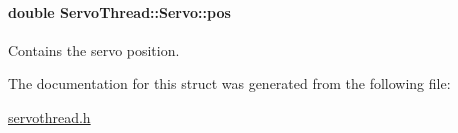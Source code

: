 \hypertarget{a00007_a9fa0aa56944b9b0bb9d66303d5bd4b59}{}
\paragraph[{pos}]{\setlength{\rightskip}{0pt plus 5cm}double Servo\+Thread\+::\+Servo\+::pos}\label{a00007_a9fa0aa56944b9b0bb9d66303d5bd4b59}


Contains the servo position. 



The documentation for this struct was generated from the following file\+:\begin{DoxyCompactItemize}
\item 
\hyperlink{a00024}{servothread.\+h}\end{DoxyCompactItemize}
